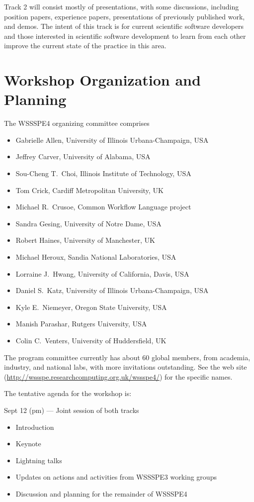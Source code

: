 \documentclass[11pt]{article}
\newenvironment{shortlist}{
        \vspace*{-0.8em}
  \begin{itemize}
  \setlength{\itemsep}{-0.3em}
}{
  \end{itemize}
        \vspace*{-0.6em}
}
\begin{document}
Track 2 will consist mostly of presentations, with some discussions, including position papers, experience papers, presentations of previously published work, and demos.  The intent of this
track is for current scientific software developers and those interested in scientific software development to learn from each other improve the current state of the practice in this area.


\section{Workshop Organization and Planning}

The WSSSPE4 organizing committee comprises 
\begin{shortlist}
\item Gabrielle Allen, University of Illinois Urbana-Champaign, USA
\item Jeffrey Carver, University of Alabama, USA
\item Sou-Cheng T.~Choi, Illinois Institute of Technology, USA
\item Tom Crick, Cardiff Metropolitan University, UK
\item Michael R.~Crusoe, Common Workflow Language project
\item Sandra Gesing, University of Notre Dame, USA
\item Robert Haines, University of Manchester, UK
\item Michael Heroux, Sandia National Laboratories, USA
\item Lorraine J.~Hwang, University of California, Davis, USA
\item Daniel S.~Katz, University of Illinois Urbana-Champaign, USA
\item Kyle E.~Niemeyer, Oregon State University, USA
\item Manish Parashar, Rutgers University, USA
\item Colin C.~Venters, University of Huddersfield, UK
\end{shortlist}

The program committee currently has about 60 global members, from academia, industry, and national labs, with more invitations outstanding.  See the web site (\url{http://wssspe.researchcomputing.org.uk/wssspe4/}) for the specific names.


The tentative agenda for the workshop is:

Sept 12 (pm) --- Joint session of both tracks

\begin{shortlist}
\item Introduction
\item Keynote
\item Lightning talks
\item Updates on actions and activities from WSSSPE3 working groups
\item Discussion and planning for the remainder of WSSSPE4
\end{shortlist}
\end{document}
